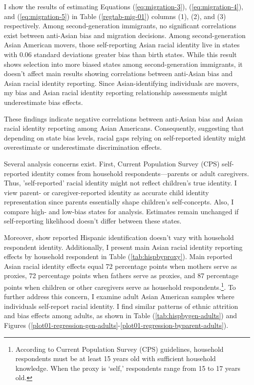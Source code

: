 I show the results of estimating Equations (\ref{eq:migration-3}), (\ref{eq:migration-4}), and (\ref{eq:migration-5}) in Table (\ref{regtab-mig-01}) columns (1), (2), and (3) respectively. Among second-generation immigrants, no significant correlations exist between anti-Asian bias and migration decisions. Among second-generation Asian American movers, those self-reporting Asian racial identity live in states with 0.06 standard deviations greater bias than birth states. While this result shows selection into more biased states among second-generation immigrants, it doesn't affect main results showing correlations between anti-Asian bias and Asian racial identity reporting. Since Asian-identifying individuals are movers, my bias and Asian racial identity reporting relationship assessments might underestimate bias effects.

These findings indicate negative correlations between anti-Asian bias and Asian racial identity reporting among Asian Americans. Consequently, suggesting that depending on state bias levels, racial gaps relying on self-reported identity might overestimate or underestimate discrimination effects.

Several analysis concerns exist. First, Current Population Survey (CPS) self-reported identity comes from household respondents—parents or adult caregivers. Thus, 'self-reported' racial identity might not reflect children's true identity. I view parent- or caregiver-reported identity as accurate child identity representation since parents essentially shape children's self-concepts. Also, I compare high- and low-bias states for analysis. Estimates remain unchanged if self-reporting likelihood doesn't differ between these states.

Moreover, \textcite{duncanIntermarriageIntergenerationalTransmission2011} show reported Hispanic identification doesn't vary with household respondent identity. Additionally, I present main Asian racial identity reporting effects by household respondent in Table (\ref{tab:hispbyproxy}). Main reported Asian racial identity effects equal 72 percentage points when mothers serve as proxies, 72 percentage points when fathers serve as proxies, and 87 percentage points when children or other caregivers serve as household respondents.\footnote{According to Current Population Survey (CPS) guidelines, household respondents must be at least 15 years old with sufficient household knowledge. When the proxy is `self,' respondents range from 15 to 17 years old.}. To further address this concern, I examine adult Asian American samples where individuals self-report racial identity. I find similar patterns of ethnic attrition and bias effects among adults, as shown in Table (\ref{tab:hispbygen-adults}) and Figures (\ref{plot01-regression-gen-adults}-\ref{plot01-regression-byparent-adults}).

